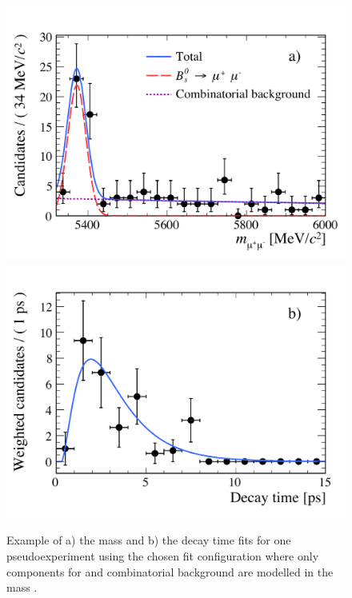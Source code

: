 {%

\pagebreak



\begin{figure}[tbp]
    \centering
        \includegraphics[width= 0.49 \textwidth]{./Figs/LifetimeMeasurement/5320-6000_toy_mass.pdf}
       \includegraphics[width=0.49 \textwidth]{./Figs/LifetimeMeasurement/5320-6000_toy_lifetime.pdf}
    \caption{Example of a) the mass and b) the decay time \ml fits for one pseudoexperiment using the chosen fit configuration where only components for \bsmumu and combinatorial background are modelled in the mass \pdf.}
    \label{fig:toyegs}
\end{figure}

}
